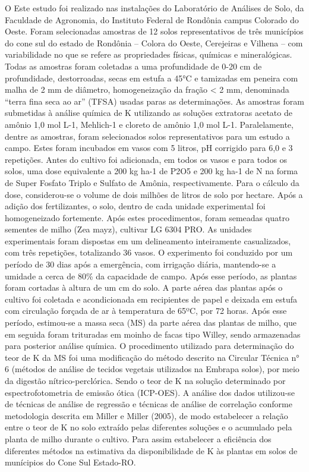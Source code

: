 \documentclass[article,12pt,onesidea,4paper,english,brazil]{abntex2}
\begin{document}
	O Este estudo foi realizado nas instalações do Laboratório de Análises de Solo, da Faculdade de Agronomia, do Instituto Federal de Rondônia campus Colorado do Oeste. Foram selecionadas amostras de 12 solos representativos de três municípios do cone sul do estado de Rondônia – Colora do Oeste, Cerejeiras e Vilhena – com variabilidade no que se refere as propriedades físicas, químicas e mineralógicas. Todas as amostras foram coletadas a uma profundidade de 0-20 cm de profundidade, destorroadas, secas em estufa a 45°C e tamizadas em peneira com malha de 2 mm de diâmetro, homogeneização da fração < 2 mm, denominada “terra fina seca ao ar” (TFSA) usadas paras as determinações.
	As amostras foram submetidas à análise química de K utilizando as soluções extratoras acetato de amônio 1,0 mol L-1, Mehlich-1 e cloreto de amônio 1,0 mol L-1.
	Paralelamente, dentre as amostras, foram selecionados solos representativos para um estudo a campo. Estes foram incubados em vasos com 5 litros, pH corrigido para 6,0 e 3 repetições.
	Antes do cultivo foi adicionada, em todos os vasos e para todos os solos, uma dose equivalente a 200 kg ha-1 de P2O5 e 200 kg ha-1 de N na forma de Super Fosfato Triplo e Sulfato de Amônia, respectivamente. Para o cálculo da dose, considerou-se o volume de dois milhões de litros de solo por hectare. Após a adição dos fertilizantes, o solo, dentro de cada unidade experimental foi homogeneizado fortemente. Após estes procedimentos, foram semeadas quatro sementes de milho (Zea mayz), cultivar LG 6304 PRO.
	As unidades experimentais foram dispostas em um delineamento inteiramente casualizados, com três repetições, totalizando 36 vasos. O experimento foi conduzido por um período de 30 dias após a emergência, com irrigação diária, mantendo-se a umidade a cerca de 80\% da capacidade de campo. Após esse período, as plantas foram cortadas à altura de um cm do solo.
	A parte aérea das plantas após o cultivo foi coletada e acondicionada em recipientes de papel e deixada em estufa com circulação forçada de ar à temperatura de 65ºC, por 72 horas. Após esse período, estimou-se a massa seca (MS) da parte aérea das plantas de milho, que em seguida foram trituradas em moinho de facas tipo Willey, sendo armazenadas para posterior análise química. O procedimento utilizado para determinação do teor de K da MS foi uma modificação do método descrito na Circular Técnica n° 6 (métodos de análise de tecidos vegetais utilizados na Embrapa solos), por meio da digestão nítrico-perclórica. Sendo o teor de K na solução determinado por espectrofotometria de emissão ótica (ICP-OES).
	A análise dos dados utilizou-se de técnicas de análise de regressão e técnicas de análise de correlação conforme metodologia descrita em Miller e Miller (2005), de modo estabelecer a relação entre o teor de K no solo extraído pelas diferentes soluções e o acumulado pela planta de milho durante o cultivo. Para assim estabelecer a eficiência dos diferentes métodos na estimativa da disponibilidade de K às plantas em solos de munícipios do Cone Sul Estado-RO.
	
\end{document}
